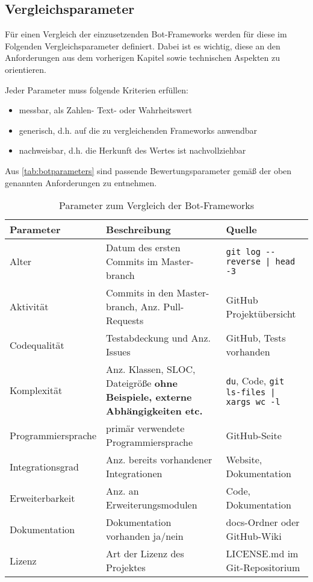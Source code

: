 
\subsection{Vergleichsparameter}
Für einen Vergleich der einzusetzenden Bot-Frameworks werden für diese im Folgenden Vergleichsparameter definiert. Dabei ist es wichtig, diese an den Anforderungen aus dem vorherigen Kapitel sowie technischen Aspekten zu orientieren.

Jeder Parameter muss folgende Kriterien erfüllen:

\begin{itemize}
    \item messbar, als Zahlen- Text- oder Wahrheitswert
    \item generisch, d.h. auf die zu vergleichenden Frameworks anwendbar
    \item nachweisbar, d.h. die Herkunft des Wertes ist nachvollziehbar
\end{itemize}

Aus \autoref{tab:botparameters} sind passende Bewertungsparameter gemäß der oben genannten Anforderungen zu entnehmen.

\begin{table}[htbp]
    \begin{tabularx}{\textwidth}{lXp{6cm}}
   \hline
   \textbf{Parameter} & \textbf{Beschreibung} & \textbf{Quelle} \\
   \hline
   Alter & Datum des ersten Commits im Master-branch & \verb+git log --reverse | head -3+\\
   \hline
   Aktivität & Commits in den Master-branch, Anz. Pull-Requests & GitHub Projektübersicht \\
   \hline
   Codequalität & Testabdeckung und Anz. Issues & GitHub, Tests vorhanden \\
   \hline
   Komplexität & Anz. Klassen, SLOC, Dateigröße \textbf{ohne Beispiele, externe Abhängigkeiten etc.} & \verb+du+, Code, \verb+git ls-files | xargs wc -l+ \\
   \hline
   Programmiersprache & primär verwendete Programmiersprache & GitHub-Seite \\
   \hline
   Integrationsgrad & Anz. bereits vorhandener Integrationen & Website, Dokumentation \\
   \hline
   Erweiterbarkeit & Anz. an Erweiterungsmodulen & Code, Dokumentation \\
   \hline
   Dokumentation & Dokumentation vorhanden ja/nein & docs-Ordner oder GitHub-Wiki \\
   \hline
   Lizenz & Art der Lizenz des Projektes & LICENSE.md im Git-Repositorium \\
   \hline
\end{tabularx}
\caption{Parameter zum Vergleich der Bot-Frameworks}
\label{tab:botparameters}
\end{table}

